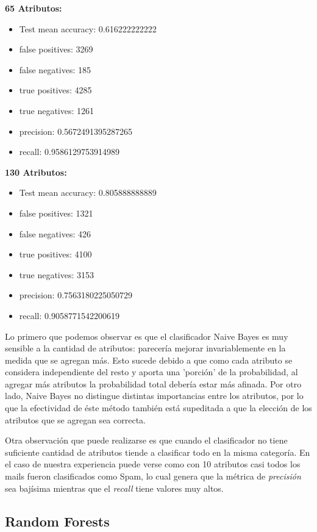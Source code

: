 \documentclass[10pt,a4paper]{article}
\begin{document}
\textbf{65 Atributos:}
\begin{itemize}
	\item Test mean accuracy: 0.616222222222
	\item false positives: 3269
	\item false negatives: 185
	\item true positives:  4285
	\item true negatives:  1261
	\item precision: 0.5672491395287265
	\item recall: 0.9586129753914989
\end{itemize}
\textbf{130 Atributos:}
\begin{itemize}
	\item Test mean accuracy: 0.805888888889
	\item false positives: 1321
	\item false negatives: 426
	\item true positives:  4100
	\item true negatives:  3153
	\item precision: 0.7563180225050729
	\item recall: 0.9058771542200619
\end{itemize}

Lo primero que podemos observar es que el clasificador Naive Bayes es muy sensible a la cantidad de atributos: parecería mejorar invariablemente en la medida que se agregan más. Esto sucede debido a que como cada atributo se considera independiente del resto y aporta una 'porción' de la probabilidad, al agregar más atributos la probabilidad total debería estar más afinada. Por otro lado, Naive Bayes no distingue distintas importancias entre los atributos, por lo que la efectividad de éste método también está supeditada a que la elección de los atributos que se agregan sea correcta.

Otra observación que puede realizarse es que cuando el clasificador no tiene suficiente cantidad de atributos tiende a clasificar todo en la misma categoría. En el caso de nuestra experiencia puede verse como con 10 atributos casi todos los mails fueron clasificados como Spam, lo cual genera que la métrica de \textit{precisión} sea bajísima mientras que el \textit{recall} tiene valores muy altos.


\subsection{Random Forests}
\end{document}
